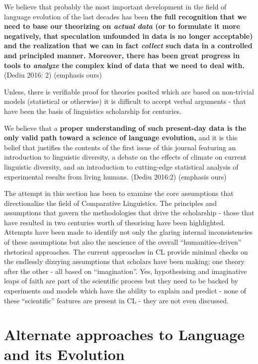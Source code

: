 \begin{myquote}
We believe that probably the most important development in the field of language evolution of the last decades has been \textbf{the full recognition that we need to base our theorizing on \textit{actual data} (or to formulate it more negatively, that speculation unfounded in data is no longer acceptable) and the realization that we can in fact \textit{collect} such data in a controlled and principled manner. Moreover, there has been great progress in tools to \textit{analyze} the complex kind of data that we need to deal with.} (Dediu 2016: 2) (emphasis ours)
\end{myquote}

Unless, there is verifiable proof for theories posited which are based on non-trivial models (statistical or otherwise) it is difficult to accept verbal arguments - that have been the basis of linguistics scholarship for centuries.

\begin{myquote}
We believe that a \textbf{proper understanding of such present-day data is the only valid path toward a science of language evolution,} and it is this belief that justifies the contents of the first issue of this journal featuring an introduction to linguistic diversity, a debate on the effects of climate on current linguistic diversity, and an introduction to cutting-edge statistical analysis of experimental results from living humans. (Dediu 2016:2) (emphasis ours)
\end{myquote}

The attempt in this section has been to examine the core assumptions that directionalize the field of Comparative Linguistics. The principles and assumptions that govern the methodologies that drive the scholarship - those that have resulted in two centuries worth of theorising have been highlighted. Attempts have been made to identify not only the glaring internal inconsistencies of these assumptions but also the nescience of the overall “humanities-driven” rhetorical approaches. The current approaches in CL provide minimal checks on the endlessly dizzying assumptions that scholars have been making; one theory after the other - all based on “imagination”. Yes, hypothesising and imaginative leaps of faith are part of the scientific process but they need to be backed by experiments and models which have the ability to explain and predict - none of these “scientific” features are present in CL - they are not even discussed.


\section*{Alternate approaches to Language and its Evolution}

